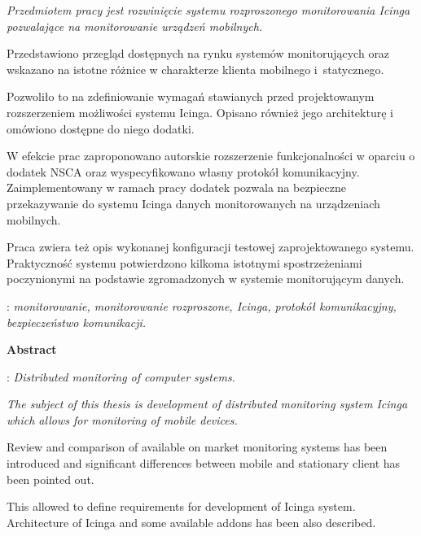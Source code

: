 \begin{titlepage}
    {\itshape Przedmiotem pracy jest rozwinięcie systemu rozproszonego
      monitorowania Icinga pozwalające na monitorowanie urządzeń mobilnych.

      \indent Przedstawiono przegląd dostępnych na rynku systemów
      monitorujących oraz wskazano na istotne różnice w charakterze
      klienta mobilnego i~statycznego.

      Pozwoliło to na zdefiniowanie wymagań stawianych przed
      projektowanym rozszerzeniem możliwości systemu Icinga. Opisano
      również jego architekturę i omówiono dostępne do niego dodatki.

      \indent W efekcie prac zaproponowano autorskie rozszerzenie
      funkcjonalności w oparciu o dodatek NSCA oraz wyspecyfikowano
      własny protokół komunikacyjny. Zaimplementowany w ramach pracy
      dodatek pozwala na bezpieczne przekazywanie do systemu Icinga
      danych monitorowanych na urządzeniach mobilnych.

      \indent Praca zwiera też opis wykonanej konfiguracji testowej
      zaprojektowanego systemu. Praktyczność systemu potwierdzono
      kilkoma istotnymi spostrzeżeniami poczynionymi na podstawie
      zgromadzonych w systemie monitorującym danych.}\vspace*{1\baselineskip}

    : {\itshape monitorowanie,
      monitorowanie rozproszone, Icinga, protokół komunikacyjny, bezpieczeństwo komunikacji.}
    \par
    \vspace{4\baselineskip}
    \begin{center}
	{\large\bfseries Abstract}\par\bigskip
    \end{center}
    : {\itshape Distributed monitoring of computer
      systems.}\par
    \vspace*{1\baselineskip} {\itshape The subject of this thesis is
      development of distributed monitoring system Icinga which allows
      for monitoring of mobile devices.

      \indent Review and comparison of available on market monitoring
      systems has been introduced and significant differences between
      mobile and stationary client has been pointed out.

      This allowed to define requirements for development of Icinga
      system. Architecture of Icinga and some available addons has
      been also described.

}
\end{titlepage}
